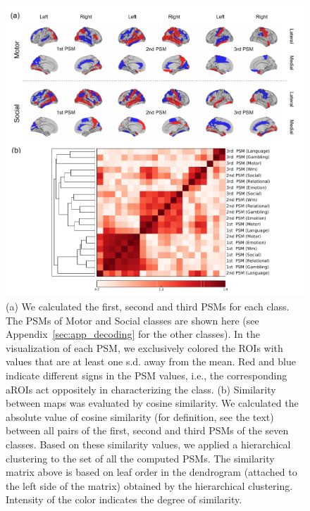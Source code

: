 \begin{figure}[htpb]
\begin{center}
\includegraphics[width=1.\columnwidth]{figures/psa_final/psa_and_similarity.pdf}
\caption{\label{fig:PSA}
(a)
We calculated the first, second and third PSMs for each class. The PSMs
 of Motor and Social classes are shown here (see Appendix~\ref{sec:app_decoding} for the other classes).
In the visualization of each PSM, we exclusively colored the ROIs with values that are at least one s.d. away from the mean.
Red and blue indicate different signs in the PSM values, i.e., the corresponding aROIs act oppositely in characterizing the class.
(b)
Similarity between maps was evaluated by cosine similarity.
We calculated the absolute value of cosine similarity (for definition,
 see the text) between all pairs of the first, second and third  PSMs of the seven classes. Based on these similarity values, we applied a hierarchical clustering to the set of all the computed PSMs.
The similarity matrix above is based on leaf order in the dendrogram (attached to the left side of the matrix) obtained by the hierarchical clustering. Intensity of the color indicates the degree of similarity.
}
\end{center}
\end{figure}
